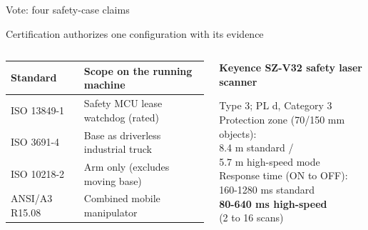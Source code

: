 \documentclass[aspectratio=169, 12pt]{beamer}
\newenvironment{logblock}[1][7]{\par\ttfamily\fontsize{#1}{8.4}\selectfont\raggedright\setlength{\parskip}{0pt}}{\par}
\newcommand{\ind}[1]{\hspace*{#1\fontcharwd\font`0}}
\begin{document}
\begin{frame}{Vote: four safety-case claims}
{  


}
\end{frame}

\begin{frame}{Certification authorizes one configuration with its evidence}
  \begin{columns}[T]
    \begin{column}{0.50\textwidth}
      \footnotesize
      \begin{tabular}{@{}P{2.1cm}P{4.8cm}@{}}\toprule
        \textbf{Standard} & \textbf{Scope on the running machine}\\\midrule
        ISO 13849-1 & Safety MCU lease watchdog (rated)\\
        ISO 3691-4 & Base as driverless industrial truck\\
        ISO 10218-2 & Arm only (excludes moving base)\\
        ANSI/A3 R15.08 & Combined mobile manipulator\\\bottomrule
      \end{tabular}
    \end{column}
    \begin{column}{0.48\textwidth}
      {\small\textbf{Keyence SZ-V32 safety laser scanner}}\par\vspace{0.1cm}
      \begin{logblock}[8.6]
        Type 3; PL d, Category 3\\[0.1cm]
        Protection zone (70/150 mm objects):\\
        \ind{2}8.4 m standard /\\
        \ind{2}5.7 m high-speed mode\\[0.1cm]
        Response time (ON to OFF):\\
        \ind{2}160-1280 ms standard\\
        \ind{2}\textbf{80-640 ms high-speed}\\
        \ind{2}(2 to 16 scans)
      \end{logblock}
      \vspace{0.1cm}

\end{column}
\end{columns}
\end{frame}
\end{document}
